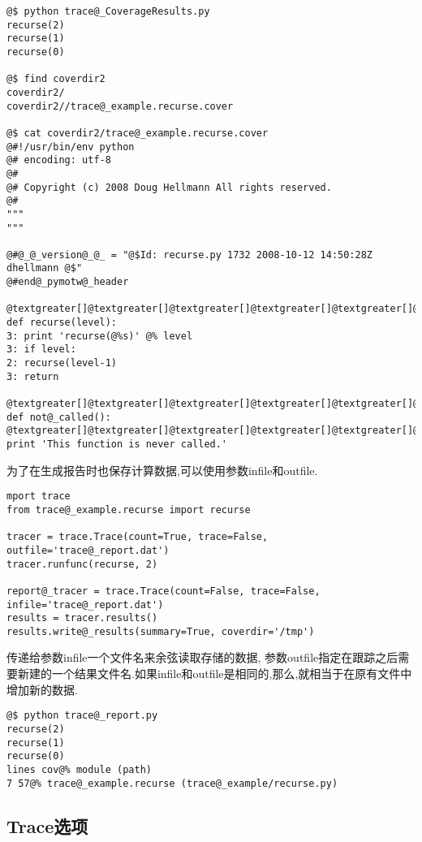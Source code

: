 \documentclass[letterpaper,10pt,english]{manual}
\begin{document}
\begin{Verbatim}[commandchars=@\[\]]
@$ python trace@_CoverageResults.py
recurse(2)
recurse(1)
recurse(0)

@$ find coverdir2
coverdir2/
coverdir2//trace@_example.recurse.cover

@$ cat coverdir2/trace@_example.recurse.cover
@#!/usr/bin/env python
@# encoding: utf-8
@#
@# Copyright (c) 2008 Doug Hellmann All rights reserved.
@#
"""
"""

@#@_@_version@_@_ = "@$Id: recurse.py 1732 2008-10-12 14:50:28Z dhellmann @$"
@#end@_pymotw@_header

@textgreater[]@textgreater[]@textgreater[]@textgreater[]@textgreater[]@textgreater[] def recurse(level):
3: print 'recurse(@%s)' @% level
3: if level:
2: recurse(level-1)
3: return

@textgreater[]@textgreater[]@textgreater[]@textgreater[]@textgreater[]@textgreater[] def not@_called():
@textgreater[]@textgreater[]@textgreater[]@textgreater[]@textgreater[]@textgreater[] print 'This function is never called.'
\end{Verbatim}

为了在生成报告时也保存计算数据,可以使用参数infile和outfile.

\begin{Verbatim}[commandchars=@\[\]]
mport trace
from trace@_example.recurse import recurse

tracer = trace.Trace(count=True, trace=False, outfile='trace@_report.dat')
tracer.runfunc(recurse, 2)

report@_tracer = trace.Trace(count=False, trace=False, infile='trace@_report.dat')
results = tracer.results()
results.write@_results(summary=True, coverdir='/tmp')
\end{Verbatim}

传递给参数infile一个文件名来余弦读取存储的数据, 参数outfile指定在跟踪之后需要新建的一个结果文件名.如果infile和outfile是相同的,那么,就相当于在原有文件中增加新的数据.

\begin{Verbatim}[commandchars=@\[\]]
@$ python trace@_report.py
recurse(2)
recurse(1)
recurse(0)
lines cov@% module (path)
7 57@% trace@_example.recurse (trace@_example/recurse.py)
\end{Verbatim}


\subsection{Trace选项}
\end{document}
